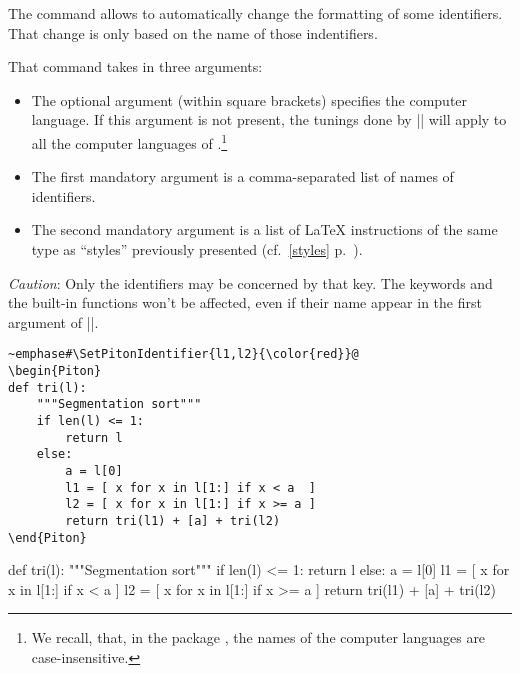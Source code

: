\documentclass{article}
\begin{document}
\label{SetPitonIdentifier}

The command  allows to automatically
change the formatting of some identifiers. That change is only based on the
name of those indentifiers.

\smallskip
That command takes in three arguments: 

\begin{itemize}
\item The optional argument (within square brackets) specifies the computer
language. If this argument is not present, the tunings done by
|\SetPitonIdentifier| will apply to all the computer languages of
.\footnote{We recall, that, in the package , the
names of the computer languages are case-insensitive.}

\item The first mandatory argument is a comma-separated list of names of
identifiers.

\item The second mandatory argument is a list of LaTeX instructions of the
same type as  ``styles'' previously presented (cf.~\ref{styles}
p.~\pageref{styles}). 
\end{itemize}

\emph{Caution}: Only the identifiers may be concerned by that key. The
keywords and the built-in functions won't be affected, even if their name
appear in the first argument of |\SetPitonIdentifier|.

\begin{Verbatim}
~emphase#\SetPitonIdentifier{l1,l2}{\color{red}}@
\begin{Piton}
def tri(l):
    """Segmentation sort"""
    if len(l) <= 1:
        return l
    else:
        a = l[0]
        l1 = [ x for x in l[1:] if x < a  ]
        l2 = [ x for x in l[1:] if x >= a ]
        return tri(l1) + [a] + tri(l2)
\end{Piton}
\end{Verbatim}


\bigskip

\begingroup


\begin{Piton}
def tri(l):
    """Segmentation sort"""
    if len(l) <= 1:
        return l
    else:
        a = l[0]
        l1 = [ x for x in l[1:] if x < a  ]
        l2 = [ x for x in l[1:] if x >= a ]
        return tri(l1) + [a] + tri(l2)
\end{Piton}
\end{document}
